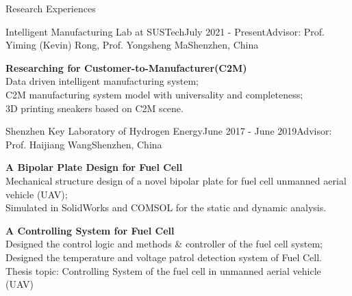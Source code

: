 \documentclass{resume} %
\begin{document}

\begin{rSection}{Research Experiences}

    \begin{rSubsection}{Intelligent Manufacturing Lab at SUSTech}{July 2021 - Present}{Advisor: Prof. Yiming (Kevin) Rong, Prof. Yongsheng Ma}{Shenzhen, China}
    \vspace{-4pt}
    \item \textbf{Researching for Customer-to-Manufacturer(C2M) } \\
    Data driven intelligent manufacturing system;\\
    C2M manufacturing system model with universality and completeness;\\
    3D printing sneakers based on C2M scene.
    \end{rSubsection}
    
    
    \begin{rSubsection}{Shenzhen Key Laboratory of Hydrogen Energy}{June 2017 - June 2019}{Advisor: Prof. Haijiang Wang}{Shenzhen, China}
    \vspace{-4pt}
    \item \textbf{A Bipolar Plate Design for Fuel Cell} \\
    Mechanical structure design of a novel bipolar plate for fuel cell unmanned aerial vehicle (UAV);\\
    Simulated in SolidWorks and COMSOL for the static and dynamic analysis.

    \item \textbf{A Controlling System for Fuel Cell}\\ 
    Designed the control logic and methods \& controller of the fuel cell system; \\
    Designed the temperature and voltage patrol detection system of Fuel Cell.\\
    Thesis topic: Controlling System of the fuel cell in unmanned aerial vehicle (UAV)


\end{rSubsection}
\end{rSection}
\end{document}
